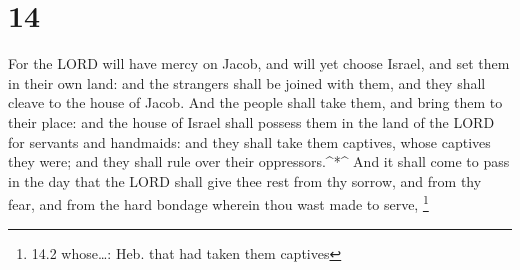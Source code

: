 \hypertarget{section-13}{%
\section{14}\label{section-13}}

 For the LORD will have mercy on Jacob, and will yet choose
Israel, and set them in their own land: and the strangers shall be
joined with them, and they shall cleave to the house of Jacob.
 And the people shall take them, and bring them to their
place: and the house of Israel shall possess them in the land of the
LORD for servants and handmaids: and they shall take them captives,
whose captives they were; and they shall rule over their
oppressors.\^{}*\^{}  And it shall come to pass in the day
that the LORD shall give thee rest from thy sorrow, and from thy fear,
and from the hard bondage wherein thou wast made to serve, \footnote{14.2
  whose\ldots: Heb. that had taken them captives}

